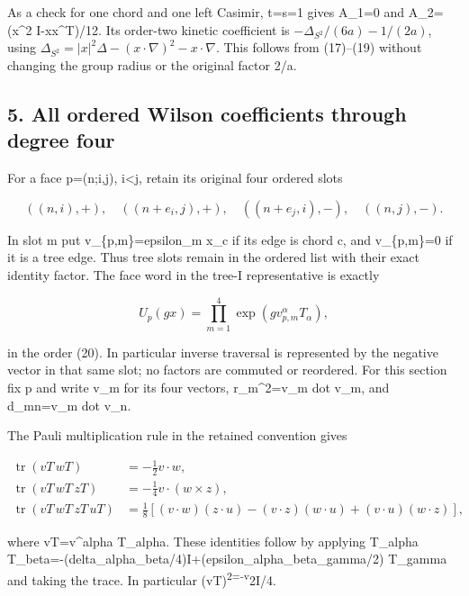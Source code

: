 \documentclass[
  11pt,
]{article}
\begin{document}
As a check for one chord and one left Casimir, t=s=1 gives A\_1=0 and
A\_2=(\textbar x\textbar\^{}2 I-xx\^{}T)/12. Its order-two kinetic
coefficient is \(-\Delta_{S^2}/(6a)-1/(2a)\), using
\(\Delta_{S^2}=|x|^2\Delta-(x\cdot\nabla)^2-x\cdot\nabla\). This follows
from (17)--(19) without changing the group radius or the original factor
2/a.

\subsection{5. All ordered Wilson coefficients through degree
four}\label{weak-coupling-part-14-all-ordered-wilson-coefficients-through-degree-four}

For a face p=(n;i,j), i\textless j, retain its original four ordered
slots

\[
 ((n,i),+),\quad ((n+e_i,j),+),\quad
 ((n+e_j,i),-),\quad ((n,j),-).                            \tag{20}
\]

In slot m put v\_\{p,m\}=epsilon\_m x\_c if its edge is chord c, and
v\_\{p,m\}=0 if it is a tree edge. Thus tree slots remain in the ordered
list with their exact identity factor. The face word in the tree-I
representative is exactly

\[
 U_p(gx)=\prod_{m=1}^4\exp(g v_{p,m}^\alpha T_\alpha),
                                                               \tag{21}
\]

in the order (20). In particular inverse traversal is represented by the
negative vector in that same slot; no factors are commuted or reordered.
For this section fix p and write v\_m for its four vectors,
r\_m\^{}2=v\_m dot v\_m, and d\_mn=v\_m dot v\_n.

The Pauli multiplication rule in the retained convention gives

\[
 \begin{split}
 \operatorname{tr}(vT\,wT)&=-\tfrac12 v\cdot w,\\
 \operatorname{tr}(vT\,wT\,zT)&=-\tfrac14 v\cdot(w\times z),\\
 \operatorname{tr}(vT\,wT\,zT\,uT)
 &=\tfrac18[(v\cdot w)(z\cdot u)-(v\cdot z)(w\cdot u)
                                      +(v\cdot u)(w\cdot z)],
 \end{split}                                                \tag{22}
\]

where vT=v\^{}alpha T\_alpha. These identities follow by applying
T\_alpha
T\_beta=-(delta\_alpha\_beta/4)I+(epsilon\_alpha\_beta\_gamma/2)
T\_gamma and taking the trace. In particular
(vT)\textsuperscript{2=-\textbar v\textbar{}}2I/4.
\end{document}
